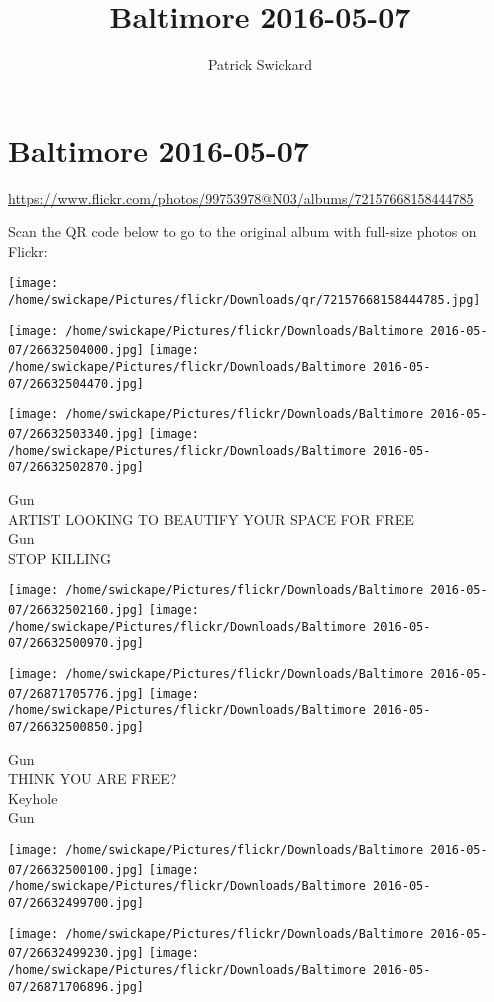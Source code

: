 \documentclass[10pt,letterpaper]{article}
\title{Baltimore 2016-05-07}
\author{Patrick Swickard}
\date{}
\begin{document}
\section*{Baltimore 2016-05-07}

\url{https://www.flickr.com/photos/99753978@N03/albums/72157668158444785}

Scan the QR code below to go to the original album with full-size photos on Flickr:

\texttt{[image: /home/swickape/Pictures/flickr/Downloads/qr/72157668158444785.jpg]}
\pagebreak

\texttt{[image: /home/swickape/Pictures/flickr/Downloads/Baltimore 2016-05-07/26632504000.jpg]}
\texttt{[image: /home/swickape/Pictures/flickr/Downloads/Baltimore 2016-05-07/26632504470.jpg]}

\texttt{[image: /home/swickape/Pictures/flickr/Downloads/Baltimore 2016-05-07/26632503340.jpg]}
\texttt{[image: /home/swickape/Pictures/flickr/Downloads/Baltimore 2016-05-07/26632502870.jpg]}

Gun\\
ARTIST LOOKING TO BEAUTIFY YOUR SPACE FOR FREE\\
Gun\\
STOP KILLING
\pagebreak

\texttt{[image: /home/swickape/Pictures/flickr/Downloads/Baltimore 2016-05-07/26632502160.jpg]}
\texttt{[image: /home/swickape/Pictures/flickr/Downloads/Baltimore 2016-05-07/26632500970.jpg]}

\texttt{[image: /home/swickape/Pictures/flickr/Downloads/Baltimore 2016-05-07/26871705776.jpg]}
\texttt{[image: /home/swickape/Pictures/flickr/Downloads/Baltimore 2016-05-07/26632500850.jpg]}

Gun\\
THINK YOU ARE FREE?\\
Keyhole\\
Gun
\pagebreak

\texttt{[image: /home/swickape/Pictures/flickr/Downloads/Baltimore 2016-05-07/26632500100.jpg]}
\texttt{[image: /home/swickape/Pictures/flickr/Downloads/Baltimore 2016-05-07/26632499700.jpg]}

\texttt{[image: /home/swickape/Pictures/flickr/Downloads/Baltimore 2016-05-07/26632499230.jpg]}
\texttt{[image: /home/swickape/Pictures/flickr/Downloads/Baltimore 2016-05-07/26871706896.jpg]}
\end{document}
